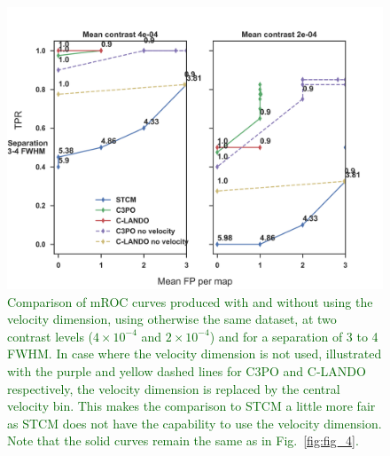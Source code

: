 \documentclass{aa}
\newcommand{\newchange}[1]{\textcolor{darkgreen}{#1}}
\begin{document}
\begin{figure}
    \centering
    \includegraphics[width=\textwidth]{Fig6_March2024_referee.png}
    \caption{\newchange{Comparison of mROC curves produced with and without using the velocity dimension, using otherwise the same dataset, at two contrast levels ($4\times 10^{-4}$ and $2\times 10^{-4}$) and for a separation of 3 to 4 FWHM. In case where the velocity dimension is not used, illustrated with the purple and yellow dashed lines for C3PO and C-LANDO respectively, the velocity dimension is replaced by the central velocity bin. This makes the comparison to STCM a little more fair as STCM does not have the capability to use the velocity dimension.
    Note that the solid curves remain the same as in Fig.~\ref{fig:fig_4}.}
    }
    \label{fig:novel_roc}
\end{figure}
\end{document}

